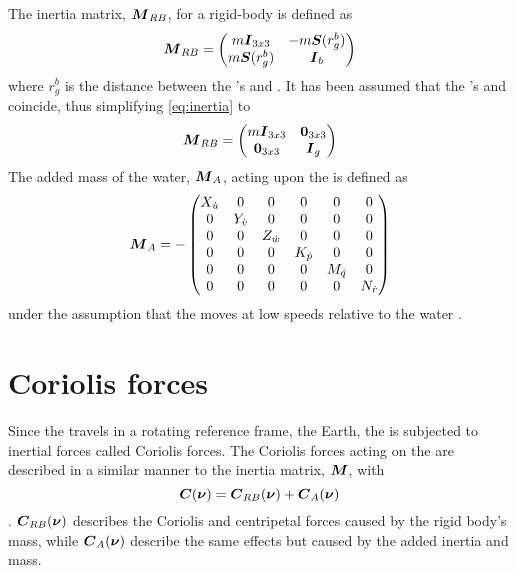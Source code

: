 The inertia matrix, $\boldsymbol{M}_{RB}$, for a rigid-body is defined as
\begin{equation}
\label{eq:inertia}
    \boldsymbol{M}_{RB} = 
    \begin{pmatrix}
    m\boldsymbol{I}_{3x3}       & -m\boldsymbol{S}(r^b_g) \\
    m\boldsymbol{S}(r^b_g) & \boldsymbol{I}_{b}
    \end{pmatrix}
\end{equation}
where $r^b_g$ is the distance between the \abbrROV's \abbrCO and \abbrCG \citep[p.52]{fossen2011}.
It has been assumed that the \abbrROV's \abbrCO and \abbrCG coincide, thus simplifying \eqref{eq:inertia} to
\begin{equation}
   \boldsymbol{M}_{RB} = 
    \begin{pmatrix}
        m\boldsymbol{I}_{3x3} & \boldsymbol{0}_{3x3} \\
        \boldsymbol{0}_{3x3} & \boldsymbol{I}_{g}
    \end{pmatrix}
\end{equation} 
The added mass of the water, $\boldsymbol{M}_A$, acting upon the \abbrROV is defined as
\begin{equation}
\boldsymbol{M}_A =
-\begin{pmatrix}
    X_{\dot{u}} & 0 & 0 & 0 & 0 & 0 \\
    0 & Y_{\dot{v}} & 0 & 0 & 0 & 0 \\
    0 & 0 & Z_{\dot{w}} & 0 & 0 & 0 \\
    0 & 0 & 0 & K_{\dot{p}}& 0 & 0 \\
    0 & 0 & 0 & 0 & M_{\dot{q}} & 0 \\
    0 & 0 & 0 & 0 & 0 & N_{\dot{r}} \\
    \end{pmatrix}
\end{equation}
under the assumption that the \abbrROV moves at low speeds relative to the water \citep[p.121]{fossen2011}.
\section{Coriolis forces}
Since the \abbrROV travels in a rotating reference frame, the Earth, the \abbrROV is subjected to inertial forces called Coriolis forces. The Coriolis forces acting on the \abbrROV are described in a similar manner to the inertia matrix, $\boldsymbol{M}$, with
\begin{equation}
    \boldsymbol{C}(\boldsymbol{\nu}) = \boldsymbol{C}_{RB}(\boldsymbol{\nu}) + \boldsymbol{C}_A(\boldsymbol{\nu})
\end{equation}\citep[p.110]{fossen2011}. $\boldsymbol{C}_{RB}(\boldsymbol{\nu})$ describes the Coriolis and centripetal forces caused by the rigid body's mass, while $\boldsymbol{C}_A(\boldsymbol{\nu})$ describe the same effects but caused by the added inertia and mass.

